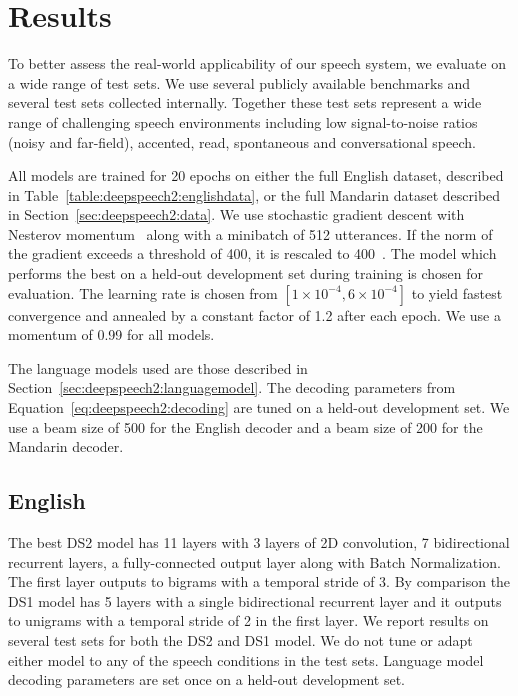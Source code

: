\section{Results}
\label{sec:deepspeech2:results}

To better assess the real-world applicability of our speech system, we evaluate
on a wide range of test sets. We use several publicly available benchmarks and
several test sets collected internally. Together these test sets represent a
wide range of challenging speech environments including low signal-to-noise
ratios (noisy and far-field), accented, read, spontaneous and conversational
speech. 

All models are trained for 20 epochs on either the full English dataset,
described in Table~\ref{table:deepspeech2:englishdata}, or the full Mandarin
dataset described in Section~\ref{sec:deepspeech2:data}. We use stochastic
gradient descent with Nesterov momentum~\cite{sutskever2013} along with a
minibatch of 512 utterances. If the norm of the gradient exceeds a threshold of
400, it is rescaled to 400~\cite{pascanu2013}. The model which performs the
best on a held-out development set during training is chosen for evaluation.
The learning rate is chosen from $[1\times10^{-4}, 6\times10^{-4}]$ to yield
fastest convergence and annealed by a constant factor of 1.2 after each epoch.
We use a momentum of 0.99 for all models.

The language models used are those described in
Section~\ref{sec:deepspeech2:languagemodel}. The decoding parameters from
Equation~\ref{eq:deepspeech2:decoding} are tuned on a held-out development set.
We use a beam size of 500 for the English decoder and a beam size of 200 for
the Mandarin decoder.

\subsection{English}
\label{sec:deepspeech2:english_results}

The best DS2 model has 11 layers with 3 layers of 2D convolution, 7
bidirectional recurrent layers, a fully-connected output layer along with Batch
Normalization. The first layer outputs to bigrams with a temporal stride of 3.
By comparison the DS1 model has 5 layers with a single bidirectional recurrent
layer and it outputs to unigrams with a temporal stride of 2 in the first
layer. We report results on several test sets for both the DS2 and DS1 model.
We do not tune or adapt either model to any of the speech conditions in the
test sets. Language model decoding parameters are set once on a held-out
development set.

